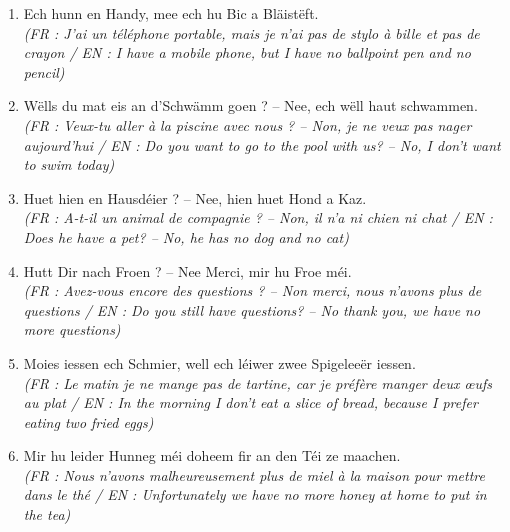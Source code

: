 \begin{enumerate}
    \item Ech hunn en Handy, mee ech hu \underline{\hspace{2.5cm}} Bic a \underline{\hspace{2.5cm}} Bläistëft. \\
    \small\textit{(FR : J'ai un téléphone portable, mais je n'ai pas de stylo à bille et pas de crayon / EN : I have a mobile phone, but I have no ballpoint pen and no pencil)}
    \item Wëlls du mat eis an d'Schwämm goen ? -- Nee, ech wëll haut \underline{\hspace{2.5cm}} schwammen. \\
    \small\textit{(FR : Veux-tu aller à la piscine avec nous ? -- Non, je ne veux pas nager aujourd'hui / EN : Do you want to go to the pool with us? -- No, I don't want to swim today)}
    \item Huet hien en Hausdéier ? -- Nee, hien huet \underline{\hspace{2.5cm}} Hond a \underline{\hspace{2.5cm}} Kaz. \\
    \small\textit{(FR : A-t-il un animal de compagnie ? -- Non, il n'a ni chien ni chat / EN : Does he have a pet? -- No, he has no dog and no cat)}
    \item Hutt Dir nach Froen ? -- Nee Merci, mir hu \underline{\hspace{2.5cm}} Froe méi. \\
    \small\textit{(FR : Avez-vous encore des questions ? -- Non merci, nous n'avons plus de questions / EN : Do you still have questions? -- No thank you, we have no more questions)}
    \item Moies iessen ech \underline{\hspace{2.5cm}} Schmier, well ech léiwer zwee Spigeleeër iessen. \\
    \small\textit{(FR : Le matin je ne mange pas de tartine, car je préfère manger deux œufs au plat / EN : In the morning I don't eat a slice of bread, because I prefer eating two fried eggs)}
    \item Mir hu leider \underline{\hspace{2.5cm}} Hunneg méi doheem fir an den Téi ze maachen. \\
    \small\textit{(FR : Nous n'avons malheureusement plus de miel à la maison pour mettre dans le thé / EN : Unfortunately we have no more honey at home to put in the tea)}
\end{enumerate}

